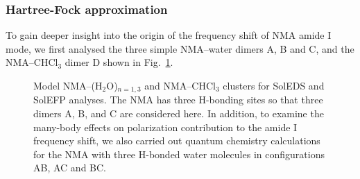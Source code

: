 \documentclass[a4paper,titlepage,twoside,fleqn,12pt]{book}
\begin{document}
\begin{refsection}
\subsubsection{Hartree-Fock approximation}

To gain deeper insight into the origin of the frequency
shift of NMA amide I mode, we first analysed the three simple
NMA--water dimers A, B and C, and the NMA--CHCl$_3$ dimer D 
shown in Fig.~\ref{f:nma-abcde}. 
%
\begin{figure}[t!]
\centering
\setlength\fboxsep{0.4pt}
\setlength\fboxrule{0.5pt}
\caption{
Model NMA--(H$_2$O)$_{n = 1,3}$ and NMA--CHCl$_3$ clusters 
for SolEDS and SolEFP analyses. The NMA has three H-bonding sites so that three dimers A, B, and C are
considered here. In addition, to examine the many\hyp{}body effects on polarization contribution 
to the amide I frequency shift, we also carried out quantum
chemistry calculations for the NMA with three H-bonded water molecules in configurations
AB, AC and BC.
\label{f:nma-abcde}}
\end{figure}
%


\end{refsection}
\end{document}
